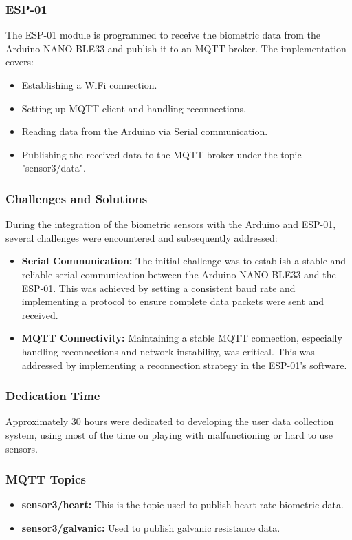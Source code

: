 \subsubsection{ESP-01}
The ESP-01 module is programmed to receive the biometric data from the Arduino NANO-BLE33 and publish it to an MQTT broker. The implementation covers:
\begin{itemize}
    \item Establishing a WiFi connection.
    \item Setting up MQTT client and handling reconnections.
    \item Reading data from the Arduino via Serial communication.
    \item Publishing the received data to the MQTT broker under the topic "sensor3/data".
\end{itemize}

\subsubsection{Challenges and Solutions}
During the integration of the biometric sensors with the Arduino and ESP-01, several challenges were encountered and subsequently addressed:
\begin{itemize}
\item \textbf{Serial Communication:} The initial challenge was to establish a stable and reliable serial communication between the Arduino NANO-BLE33 and the ESP-01. This was achieved by setting a consistent baud rate and implementing a protocol to ensure complete data packets were sent and received.
\item \textbf{MQTT Connectivity:} Maintaining a stable MQTT connection, especially handling reconnections and network instability, was critical. This was addressed by implementing a reconnection strategy in the ESP-01’s software.
\end{itemize}

\subsubsection{Dedication Time}
Approximately 30 hours were dedicated to developing the user data collection system, using most of the time on playing with malfunctioning or hard to use sensors.

\subsubsection{MQTT Topics}
\begin{itemize}
    \item \textbf{sensor3/heart:} This is the topic used to publish heart rate biometric data.
    \item \textbf{sensor3/galvanic:} Used to publish galvanic resistance data.
\end{itemize}

